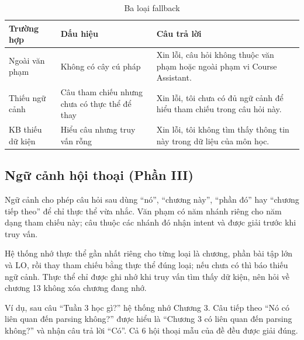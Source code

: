 \begin{table}[htbp]
  \centering
  \small
  \begin{tabularx}{\linewidth}{|P{3.2cm}|P{3.6cm}|L|}
    \hline
    \textbf{Trường hợp} & \textbf{Dấu hiệu} & \textbf{Câu trả lời} \\ \hline
    Ngoài văn phạm & Không có cây cú pháp &
      Xin lỗi, câu hỏi không thuộc văn phạm hoặc ngoài phạm vi Course Assistant. \\ \hline
    Thiếu ngữ cảnh & Câu tham chiếu nhưng chưa có thực thể để thay &
      Xin lỗi, tôi chưa có đủ ngữ cảnh để hiểu tham chiếu trong câu hỏi này. \\ \hline
    KB thiếu dữ kiện & Hiểu câu nhưng truy vấn rỗng &
      Xin lỗi, tôi không tìm thấy thông tin này trong dữ liệu của môn học. \\ \hline
  \end{tabularx}
  \caption{Ba loại fallback}
  \label{tab:fallback}
\end{table}

\subsection{Ngữ cảnh hội thoại (Phần III)}

Ngữ cảnh cho phép câu hỏi sau dùng ``nó'', ``chương này'', ``phần đó'' hay ``chương tiếp
theo'' để chỉ thực thể vừa nhắc. Văn phạm có năm nhánh riêng cho năm dạng tham chiếu này; câu
thuộc các nhánh đó nhận intent  và được giải trước khi truy vấn.

Hệ thống nhớ thực thể gần nhất riêng cho từng loại là chương, phần bài tập lớn và LO, rồi thay
tham chiếu bằng thực thể đúng loại; nếu chưa có thì báo thiếu ngữ cảnh. Thực thể chỉ được ghi
nhớ khi truy vấn tìm thấy dữ kiện, nên hỏi về chương 13 không xóa chương đang nhớ.

Ví dụ, sau câu ``Tuần 3 học gì?'' hệ thống nhớ Chương 3. Câu tiếp theo ``Nó có liên quan đến
parsing không?'' được hiểu là ``Chương 3 có liên quan đến parsing không?'' và nhận câu trả lời
``Có''. Cả 6 hội thoại mẫu của đề đều được giải đúng.
